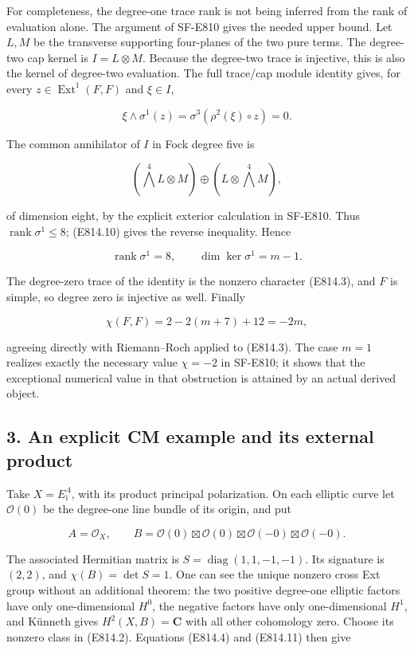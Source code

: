 For completeness, the degree-one trace rank is not being inferred from
the rank of evaluation alone. The argument of SF-E810 gives the needed
upper bound. Let \(L,M\) be the transverse supporting four-planes of the
two pure terms. The degree-two cap kernel is \(I=L\otimes M\). Because
the degree-two trace is injective, this is also the kernel of degree-two
evaluation. The full trace/cap module identity gives, for every
\(z\in\operatorname{Ext}^1(F,F)\) and \(\xi\in I\),

\[
 \xi\wedge\sigma^1(z)=\sigma^3(\rho^2(\xi)\circ z)=0.
\]

The common annihilator of \(I\) in Fock degree five is

\[
 (\bigwedge^4L\otimes M)\oplus(L\otimes\bigwedge^4M),
\]

of dimension eight, by the explicit exterior calculation in SF-E810.
Thus \(\operatorname{rank}\sigma^1\le8\); (E814.10) gives the reverse
inequality. Hence

\[
 \operatorname{rank}\sigma^1=8,
 \qquad \dim\ker\sigma^1=m-1.
 \tag{E814.11}
\]

The degree-zero trace of the identity is the nonzero character (E814.3),
and \(F\) is simple, so degree zero is injective as well. Finally

\[
 \chi(F,F)=2-2(m+7)+12=-2m,
\]

agreeing directly with Riemann--Roch applied to (E814.3). The case
\(m=1\) realizes exactly the necessary value \(\chi=-2\) in SF-E810; it
shows that the exceptional numerical value in that obstruction is
attained by an actual derived object.

\subsection{3. An explicit CM example and its external
product}\label{SF-E814-an-explicit-cm-example-and-its-external-product}

Take \(X=E_{\mathrm i}^{\,4}\), with its product principal polarization.
On each elliptic curve let \(\mathcal O(0)\) be the degree-one line
bundle of its origin, and put

\[
 A=\mathcal O_X,\qquad
 B=\mathcal O(0)\boxtimes\mathcal O(0)
       \boxtimes\mathcal O(-0)\boxtimes\mathcal O(-0).
 \tag{E814.12}
\]

The associated Hermitian matrix is \(S=\operatorname{diag}(1,1,-1,-1)\).
Its signature is \((2,2)\), and \(\chi(B)=\det S=1\). One can see the
unique nonzero cross Ext group without an additional theorem: the two
positive degree-one elliptic factors have only one-dimensional \(H^0\),
the negative factors have only one-dimensional \(H^1\), and Künneth
gives \(H^2(X,B)=\mathbf C\) with all other cohomology zero. Choose its
nonzero class in (E814.2). Equations (E814.4) and (E814.11) then give

